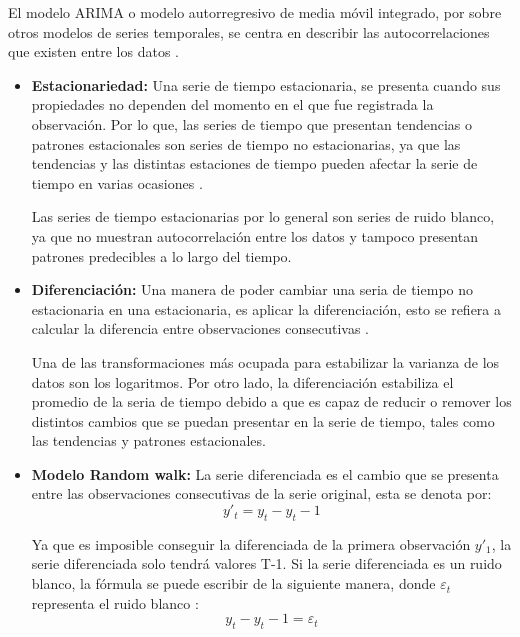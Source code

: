 El modelo ARIMA o modelo autorregresivo de media móvil integrado, por sobre otros modelos de series temporales, se centra en describir las autocorrelaciones que existen entre los datos \cite{forecast-time-series-arima}.

\begin{itemize}
    \item \textbf{Estacionariedad:} Una serie de tiempo estacionaria, se presenta cuando sus propiedades no dependen del momento en el que fue registrada la observación. Por lo que, las series de tiempo que presentan tendencias o patrones estacionales son series de tiempo no estacionarias, ya que las tendencias y las distintas estaciones de tiempo pueden afectar la serie de tiempo en varias ocasiones \cite{forecast-time-series-arima}. 
    
    Las series de tiempo estacionarias por lo general son series de ruido blanco, ya que no muestran autocorrelación entre los datos y tampoco presentan patrones predecibles a lo largo del tiempo. 

    \item \textbf{Diferenciación:} Una manera de poder cambiar una seria de tiempo no estacionaria en una estacionaria, es aplicar la diferenciación, esto se refiera a calcular la diferencia entre observaciones consecutivas \cite{forecast-time-series-arima}.
    
    Una de las transformaciones más ocupada para estabilizar la varianza de los datos son los logaritmos. Por otro lado, la diferenciación estabiliza el promedio de la seria de tiempo debido a que es capaz de reducir o remover los distintos cambios que se puedan presentar en la serie de tiempo, tales como las tendencias y patrones estacionales.
    
    \item \textbf{Modelo Random walk:} La serie diferenciada es el cambio que se presenta entre las observaciones consecutivas de la serie original, esta se denota por:
    \begin{equation*}
        y'_t = y_t - y_t-1
    \end{equation*}

    Ya que es imposible conseguir la diferenciada de la primera observación $y'_1$, la serie diferenciada solo tendrá valores T-1. Si la serie diferenciada es un ruido blanco, la fórmula se puede escribir de la siguiente manera, donde $\varepsilon_t$ representa el ruido blanco \cite{forecast-time-series-arima}:
    \begin{equation*}
        y_t-y_t-1= \varepsilon_t
    \end{equation*}


\end{itemize}
